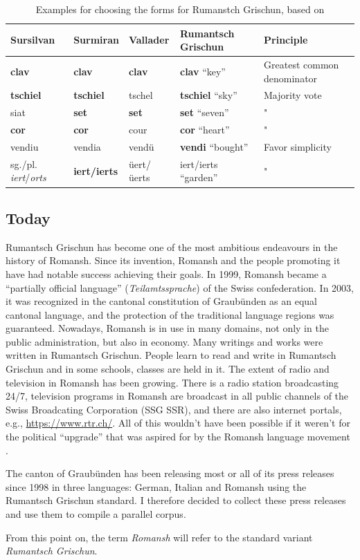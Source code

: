 \begin{table}
\centering
\begin{tabular}{lllll}
\toprule
Sursilvan & Surmiran & Vallader & Rumantsch Grischun & Principle \\
\midrule
\textbf{clav}	  &  \textbf{clav}    &  \textbf{clav}    & \textbf{clav}  \enquote{key}  & Greatest common denominator \\
\textbf{tschiel}       &   \textbf{tschiel}   & tschel      & \textbf{tschiel} \enquote{sky} & Majority vote \\
siat 	 & \textbf{set}      & \textbf{set}      & \textbf{set} \enquote{seven} & " \\
\textbf{cor} & \textbf{cor} & cour & \textbf{cor} \enquote{heart} & " \\
vendiu & vendia & vendü & \textbf{vendi} \enquote{bought} & Favor simplicity \\
sg./pl. \emph{iert}/\emph{orts} & \textbf{iert/ierts} & üert/üerts & iert/ierts \enquote{garden} & " \\
\bottomrule

\end{tabular}
\caption[Examples for choosing the forms for Rumanstch Grischun]{Examples for choosing the forms for Rumanstch Grischun, based on \cite[70-71]{liver1999}}
\label{tab:rg-examples}
\end{table}


\subsection{Today}
Rumantsch Grischun has become one of the most ambitious endeavours in the history of Romansh. 
Since its invention, Romansh and the people promoting it have had notable success achieving their goals. 
In 1999, Romansh became a \enquote{partially official language} (\emph{Teilamtssprache}) of the Swiss confederation. 
In 2003, it was recognized in the cantonal constitution of Graubünden as an equal cantonal language, and the protection of the traditional language regions was guaranteed.
Nowadays, Romansh is in use in many domains, not only in the public administration, but also in economy. 
Many writings and works were written in Rumantsch Grischun. 
People learn to read and write in Rumantsch Grischun and in some schools, classes are held in it. 
The extent of radio and television in Romansh has been growing. 
There is a radio station broadcasting 24/7, television programs in Romansh are broadcast in all public channels of the Swiss Broadcating Corporation (SSG SSR), and there are also internet portals, e.g., \url{https://www.rtr.ch/}. All of this wouldn't have been possible if it weren't for the political \enquote{upgrade} that was aspired for by the Romansh language movement \autocite{cathomas2012}.

The canton of Graubünden has been releasing most or all of its press releases since 1998 in three languages: German, Italian and Romansh using the Rumantsch Grischun standard. 
I therefore decided to collect these press releases and use them to compile a parallel corpus. 

From this point on, the term \emph{Romansh} will refer to the standard variant \emph{Rumantsch Grischun}.